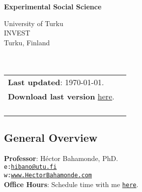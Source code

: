 \documentclass[letterpaper]{article}
\def\name{Experimental Social Science}
\begin{document}

\centerline{\huge \bf \name}



\vspace{0.25in}

\begin{minipage}{0.45\linewidth}
 University of Turku \\
  INVEST \\
  Turku, Finland\\
  \\
  \\

\end{minipage}
\hspace{4cm}\begin{minipage}{0.45\linewidth}
  \begin{tabular}{ll}
{\bf Last updated}: \today. \\
 {\bf Download last version} \href{https://github.com/hbahamonde/Exp_Soc_Science/raw/main/Bahamonde_Exp_Soc_Sci.pdf}{here}.%
    \\
    \\
    \\
    \\
    \\
  \end{tabular}
\end{minipage}

\subsection*{General Overview}


\vspace{1mm}
{\bf Professor}: H\'ector Bahamonde, PhD.\\
\texttt{e:}\href{mailto:hibano@utu.fi}{\texttt{hibano@utu.fi}}\\
\texttt{w:}\href{http://www.hectorbahamonde.com}{\texttt{www.HectorBahamonde.com}}\\
{\bf Office Hours}: Schedule time with me \href{https://calendly.com/bahamonde}{\texttt{here}}.\\
\end{document}
